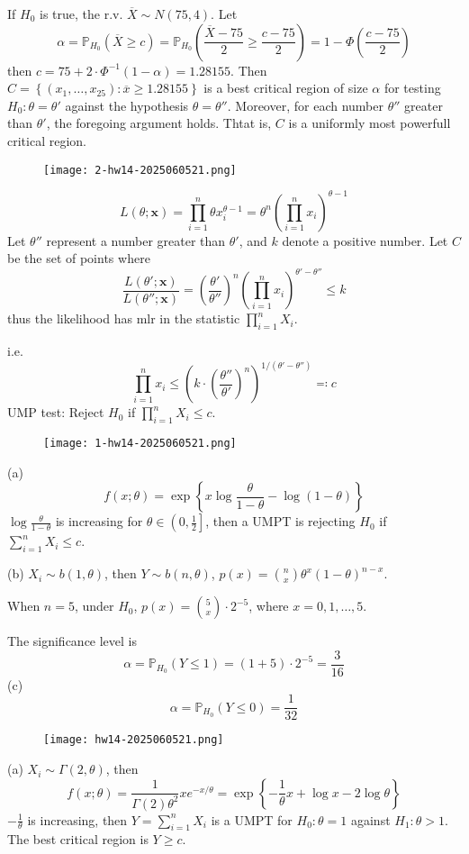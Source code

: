 If $H_0$ is true, the r.v. $\overline{X}\sim N(75,4)$. Let
\[
\alpha=\mathbb{P}_{H_0}(\overline{X}\geq c)=\mathbb{P}_{H_0}\left( \frac{\overline{X}-75}{2}\geq \frac{c-75}{2} \right)=1-\Phi\left( \frac{c-75}{2} \right)
\]
then $c=75+2\cdot\Phi ^{-1}(1-\alpha)=1.28155$. Then $C=\left\{  (x_1,\dots,x_{25}):\overline{x}\geq1.28155  \right\}$ is a best critical region of size $\alpha$ for testing $H_0:\theta=\theta'$ against the hypothesis $\theta=\theta''$. Moreover, for each number $\theta''$ greater than $\theta'$, the foregoing argument holds. Thtat is, $C$ is a uniformly most powerfull critical region.

\begin{exercise}
\begin{figure}[H]
\centering
\texttt{[image: 2-hw14-2025060521.png]}
\label{}
\end{figure}
\end{exercise}
\[
L(\theta;\mathbf{x}) = \prod_{i=1}^{n} \theta x_i^{\theta-1}=\theta^{n}\left( \prod_{i=1}^{n} x_i \right)^{\theta-1}
\]
Let $\theta''$ represent a number greater than $\theta'$, and $k$ denote a positive number. Let $C$ be the set of points where
\[
\frac{L(\theta';\mathbf{x})}{L(\theta'';\mathbf{x})}=\left( \frac{\theta'}{\theta''} \right)^{n}\left( \prod_{i=1}^{n} x_i \right)^{\theta'-\theta''}\leq k
\]
thus the likelihood has mlr in the statistic $\prod_{i=1}^{n}X_i$.

i.e.
\[
\prod_{i=1}^{n} x_i\leq \left( k\cdot\left( \frac{\theta''}{\theta'} \right)^{n} \right)^{1/(\theta'-\theta'')}\eqqcolon c
\]
UMP test: Reject $H_0$ if $\prod_{i=1}^{n}X_i\leq c$.

\begin{exercise}
\begin{figure}[H]
\centering
\texttt{[image: 1-hw14-2025060521.png]}
\label{}
\end{figure}
\end{exercise}
(a)
\[
f(x;\theta)=\exp \left\{  x\log\frac{\theta}{1-\theta}-\log(1-\theta)  \right\}
\]
$\log\frac{\theta}{1-\theta}$ is increasing for $\theta\in\left( 0,\frac{1}{2}\right]$, then a UMPT is rejecting $H_0$ if $\sum_{i=1}^{n}X_i\leq c$.

(b)
$X_i\sim b (1,\theta)$, then $Y\sim b(n,\theta)$, $p(x)=\binom{n}{x}\theta^{x}(1-\theta)^{n-x}$.

When $n=5$, under $H_0$, $p(x)=\binom{5}{x}\cdot2^{-5}$, where $x=0,1,\dots,5$.

The significance level is
\[
\alpha=\mathbb{P}_{H_0}(Y\leq 1)=(1+5)\cdot2^{-5}=\frac{3}{16}
\]
(c)
\[
\alpha=\mathbb{P}_{H_0}(Y\leq 0)=\frac{1}{32} 
\]
\begin{exercise}
\begin{figure}[H]
\centering
\texttt{[image: hw14-2025060521.png]}
\label{}
\end{figure}
\end{exercise}
(a)
$X_i\sim\Gamma(2,\theta)$, then
\[
f(x;\theta)=\frac{1}{\Gamma(2)\theta^{2}}xe^{ -x/\theta  }=\exp \left\{  -\frac{1}{\theta}x+\log x-2\log\theta  \right\}
\]
$-\frac{1}{\theta}$ is increasing, then $Y=\sum_{i=1}^{n}X_i$ is a UMPT for $H_0:\theta=1$ against $H_1:\theta>1$. The best critical region is $Y\geq c$.

